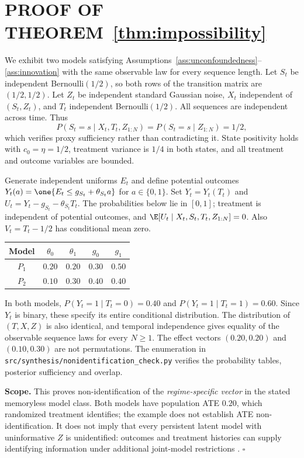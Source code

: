 \section{PROOF OF THEOREM~\ref{thm:impossibility}}
\label{app:proof_thm2}
We exhibit two models satisfying Assumptions~\ref{ass:unconfoundedness}--\ref{ass:innovation} with the same observable law for every sequence length. Let $S_t$ be independent Bernoulli$(1/2)$, so both rows of the transition matrix are $(1/2,1/2)$. Let $Z_t$ be independent standard Gaussian noise, $X_t$ independent of $(S_t,Z_t)$, and $T_t$ independent Bernoulli$(1/2)$. All sequences are independent across time. Thus
\[
P(S_t=s\mid X_t,T_t,Z_{1:N})=P(S_t=s\mid Z_{1:N})=1/2,
\]
which verifies proxy sufficiency rather than contradicting it. State positivity holds with $c_0=\eta=1/2$, treatment variance is $1/4$ in both states, and all treatment and outcome variables are bounded.

Generate independent uniforms $E_t$ and define potential outcomes $Y_t(a)=\one\{E_t\le g_{S_t}+\theta_{S_t}a\}$ for $a\in\{0,1\}$. Set $Y_t=Y_t(T_t)$ and $U_t=Y_t-g_{S_t}-\theta_{S_t}T_t$. The probabilities below lie in $[0,1]$; treatment is independent of potential outcomes, and $\E[U_t\mid X_t,S_t,T_t,Z_{1:N}]=0$. Also $V_t=T_t-1/2$ has conditional mean zero.
\begin{center}\begin{tabular}{c|cc|cc}
Model & $\theta_0$ & $\theta_1$ & $g_0$ & $g_1$\\\hline
$P_1$ & $0.20$ & $0.20$ & $0.30$ & $0.50$\\
$P_2$ & $0.10$ & $0.30$ & $0.40$ & $0.40$
\end{tabular}\end{center}
In both models, $P(Y_t=1\mid T_t=0)=0.40$ and $P(Y_t=1\mid T_t=1)=0.60$. Since $Y_t$ is binary, these specify its entire conditional distribution. The distribution of $(T,X,Z)$ is also identical, and temporal independence gives equality of the observable sequence laws for every $N\ge1$. The effect vectors $(0.20,0.20)$ and $(0.10,0.30)$ are not permutations. The enumeration in \texttt{src/synthesis/nonidentification\_check.py} verifies the probability tables, posterior sufficiency and overlap.

\textbf{Scope.} This proves non-identification of the \emph{regime-specific vector} in the stated memoryless model class. Both models have population ATE $0.20$, which randomized treatment identifies; the example does not establish ATE non-identification. It does not imply that every persistent latent model with uninformative $Z$ is unidentified: outcomes and treatment histories can supply identifying information under additional joint-model restrictions \citep{allman2009identifiability}. $\square$

